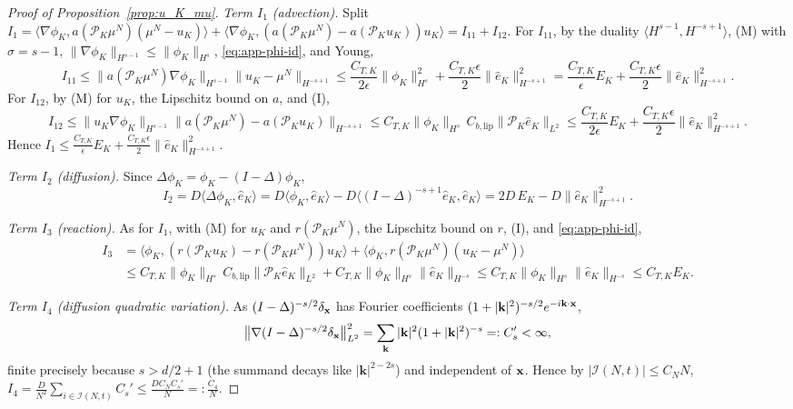 \documentclass[a4paper,fleqn]{cas-sc}
\theoremstyle{definition}
\theoremstyle{remark}
\begin{document}
\begin{proof}[Proof of Proposition~\ref{prop:u_K_mu}]
\emph{Term $I_1$ (advection).} Split
$I_1=\langle\nabla\phi_K,a(\mathcal P_K\mu^N)(\mu^N-u_K)\rangle
+\langle\nabla\phi_K,(a(\mathcal P_K\mu^N)-a(\mathcal P_K u_K))u_K\rangle=I_{11}+I_{12}$.
For $I_{11}$, by the duality $\langle H^{s-1},H^{-s+1}\rangle$, (M) with $\sigma=s-1$,
$\|\nabla\phi_K\|_{H^{s-1}}\le\|\phi_K\|_{H^s}$, \eqref{eq:app-phi-id}, and Young,
\[
I_{11}\le\|a(\mathcal P_K\mu^N)\nabla\phi_K\|_{H^{s-1}}\|u_K-\mu^N\|_{H^{-s+1}}
\le\frac{C_{T,K}}{2\epsilon}\|\phi_K\|_{H^s}^2+\frac{C_{T,K}\epsilon}{2}\|\hat e_K\|_{H^{-s+1}}^2
=\frac{C_{T,K}}{\epsilon}E_K+\frac{C_{T,K}\epsilon}{2}\|\hat e_K\|_{H^{-s+1}}^2 .
\]
For $I_{12}$, by (M) for $u_K$, the Lipschitz bound on $a$, and (I),
\[
I_{12}\le\|u_K\nabla\phi_K\|_{H^{s-1}}\bigl\|a(\mathcal P_K\mu^N)-a(\mathcal P_K u_K)\bigr\|_{H^{-s+1}}
\le C_{T,K}\|\phi_K\|_{H^s}\,C_{b,\mathrm{lip}}\|\mathcal P_K\hat e_K\|_{L^2}
\le\frac{C_{T,K}}{2\epsilon}E_K+\frac{C_{T,K}\epsilon}{2}\|\hat e_K\|_{H^{-s+1}}^2 .
\]
Hence $I_1\le\frac{C_{T,K}}{\epsilon}E_K+\frac{C_{T,K}\epsilon}{2}\|\hat e_K\|_{H^{-s+1}}^2$.

\emph{Term $I_2$ (diffusion).} Since $\Delta\phi_K=\phi_K-(I-\Delta)\phi_K$,
\[
I_2=D\langle\Delta\phi_K,\hat e_K\rangle
=D\langle\phi_K,\hat e_K\rangle-D\langle(I-\Delta)^{-s+1}\hat e_K,\hat e_K\rangle
=2D\,E_K-D\|\hat e_K\|_{H^{-s+1}}^2 .
\]

\emph{Term $I_3$ (reaction).} As for $I_1$, with (M) for $u_K$ and
$r(\mathcal P_K\mu^N)$, the Lipschitz bound on $r$, (I), and \eqref{eq:app-phi-id},
\[
\begin{aligned}
I_3&=\langle\phi_K,(r(\mathcal P_K u_K)-r(\mathcal P_K\mu^N))u_K\rangle
+\langle\phi_K,r(\mathcal P_K\mu^N)(u_K-\mu^N)\rangle\\
&\le C_{T,K}\|\phi_K\|_{H^s}\,C_{b,\mathrm{lip}}\|\mathcal P_K\hat e_K\|_{L^2}
+C_{T,K}\|\phi_K\|_{H^s}\|\hat e_K\|_{H^{-s}}
\le C_{T,K}\|\phi_K\|_{H^s}\|\hat e_K\|_{H^{-s}}\le C_{T,K}E_K .
\end{aligned}
\]

\emph{Term $I_4$ (diffusion quadratic variation).} As
$(I-\Delta)^{-s/2}\delta_{\mathbf{x}}$ has Fourier coefficients
$(1+|\mathbf k|^2)^{-s/2}e^{-i\mathbf k\cdot\mathbf{x}}$,
\[
\bigl\|\nabla(I-\Delta)^{-s/2}\delta_{\mathbf{x}}\bigr\|_{L^2}^2
=\sum_{\mathbf k}|\mathbf k|^2(1+|\mathbf k|^2)^{-s}=:C_s'<\infty,
\]
finite precisely because $s>d/2+1$ (the summand decays like $|\mathbf k|^{2-2s}$) and
independent of $\mathbf{x}$. Hence by $|\mathcal I(N,t)|\le C_N N$,
$I_4=\frac{D}{N^2}\sum_{i\in\mathcal I(N,t)}C_s'\le\frac{D C_N C_s'}{N}=:\frac{C_4}{N}$.


\end{proof}
\end{document}
